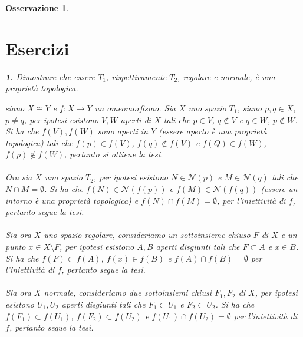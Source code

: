 \documentclass[oneside, 11pt]{amsbook}
\makeatletter
\newcommand{\0}{{(0)}}
\newcommand{\3}{{(3)}}
\theoremstyle{colonplain}
\theoremstyle{colondefinition}
\theoremstyle{colonremark}
\newtheorem{rmk}[thm]{Osservazione}
\numberwithin{equation}{chapter}
\renewcommand{\proofname}{Dimostrazione}
\renewenvironment{proof}[1][\proofname]{\par
  \pushQED{\end{proof}}%
  \normalfont \topsep6\p@\@plus6\p@\relax
  \trivlist
  \item[\hskip\labelsep\bfseries #1:]\ignorespaces
}{%
  \popQED\endtrivlist\@endpefalse
}
\makeatother
\begin{document}
\begin{rmk}
\section{Esercizi}
\textbf{1.} Dimostrare che essere $T_1$, rispettivamente $T_2$, regolare e normale, è una proprietà topologica.
\begin{proof}[Soluzione]
siano $X \cong Y$ e $f : X \longrightarrow Y$ un omeomorfismo. Sia $X$ uno spazio $T_1$, siano $p, q \in X$, $p \neq q$, per ipotesi esistono $V, W$ aperti di $X$ tali che $p \in V$, $q \not\in V$ e $q \in W$, $p \not\in W$. Si ha che $f(V), f(W)$ sono aperti in $Y$ (essere aperto è una proprietà topologica) tali che $f(p) \in f(V)$, $f(q) \not\in f(V)$ e $f(Q) \in f(W)$, $f(p) \not\in f(W)$, pertanto si ottiene la tesi. \\ \\
Ora sia $X$ uno spazio $T_2$, per ipotesi esistono $N \in \mathcal{N}(p)$ e $M \in \mathcal{N}(q)$ tali che $N \cap M = \emptyset$. Si ha che $f(N) \in \mathcal{N}(f(p))$ e $f(M) \in \mathcal{N}(f(q))$ (essere un intorno è una proprietà topologica) e $f(N) \cap f(M) = \emptyset$, per l'iniettività di $f$, pertanto segue la tesi. \\ \\
Sia ora $X$ uno spazio regolare, consideriamo un sottoinsieme chiuso $F$ di $X$ e un punto $x \in X \setminus F$, per ipotesi esistono $A, B$ aperti disgiunti tali che $F \subset A$ e $x \in B$. Si ha che $f(F) \subset f(A)$, $f(x) \in f(B)$ e $f(A) \cap f(B) = \emptyset$ per l'iniettività di $f$, pertanto segue la tesi. \\ \\
Sia ora $X$ normale, consideriamo due sottoinsiemi chiusi $F_1, F_2$ di $X$, per ipotesi esistono $U_1, U_2$ aperti disgiunti tali che $F_1 \subset U_1$ e $F_2 \subset U_2$. Si ha che $f(F_1) \subset f(U_1)$, $f(F_2) \subset f(U_2)$ e $f(U_1) \cap f(U_2) = \emptyset$ per l'iniettività di $f$, pertanto segue la tesi.
\end{proof}


\end{rmk}
\end{document}
